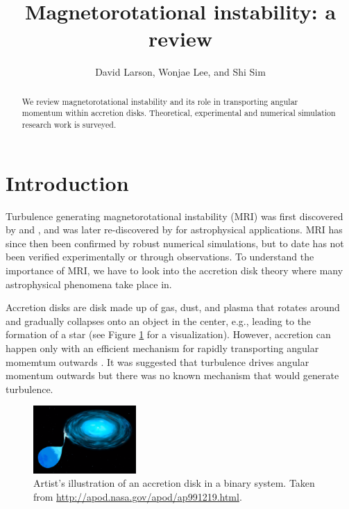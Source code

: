 \documentclass{jfm}
\title[Magnetorotational instability]{Magnetorotational instability: a review}
\author[D. Larson, W. Lee, and S. Sim]{David Larson, Wonjae Lee, and Shi Sim}
\affiliation{University of California, San Diego}
\begin{document}
\maketitle


\begin{abstract}
We review magnetorotational instability and its role in transporting angular 
momentum within accretion disks. Theoretical, experimental and numerical simulation
research work is surveyed.
\end{abstract}


\tableofcontents


\section{Introduction}
\label{sec:intro}

Turbulence generating magnetorotational instability (MRI) was first discovered
by \cite{Velikhov1959} and \cite{Chandrasekhar1960}, and was later
re-discovered by \cite{Balbus1998} for astrophysical applications. MRI has
since then been confirmed by robust numerical simulations, but to date has not
been verified experimentally or through observations. To understand the
importance of MRI, we have to look into the accretion disk theory where many
astrophysical phenomena take place in.

Accretion disks are disk made up of gas, dust, and plasma that rotates around
and gradually collapses onto an object in the center, e.g., leading to the
formation of a star (see Figure \ref{fig:accretion_disk} for a visualization).
However, accretion can happen only with an efficient mechanism for rapidly
transporting angular momemtum outwards \cite{Julien2010}. It was suggested that
turbulence drives angular momentum outwards but there was no known mechanism
that would generate turbulence. 


\begin{figure}[t]
    \centering
    \includegraphics[width=0.35\textwidth]{accretion_disk}
        \caption{Artist's illustration of an accretion disk in a binary system. Taken from \url{http://apod.nasa.gov/apod/ap991219.html}.}
        \label{fig:accretion_disk}
\end{figure}
\end{document}
